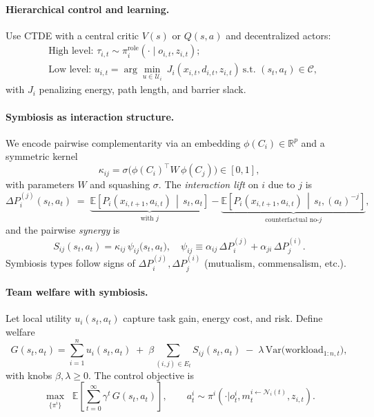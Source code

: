\paragraph{Hierarchical control and learning.}
Use CTDE with a central critic $V(s)$ or $Q(s,a)$ and decentralized actors:
\[
\begin{aligned}
&\text{High level: } \tau_{i,t}\sim \pi^{\text{role}}_i(\cdot\mid o_{i,t},z_{i,t}); \\
&\text{Low level: } u_{i,t}=\arg\min_{u\in\mathcal{U}_i}\ J_i(x_{i,t},d_{i,t},z_{i,t})
\ \text{s.t. }(s_t,a_t)\in\mathcal{C},
\end{aligned}
\]
with $J_i$ penalizing energy, path length, and barrier slack.

\paragraph{Symbiosis as interaction structure.}
We encode pairwise complementarity via an embedding $\phi(C_i)\in\mathbb{R}^p$ and a symmetric kernel
\[
\kappa_{ij}=\sigma\!\big(\phi(C_i)^\top W\,\phi(C_j)\big)\in[0,1],
\]
with parameters $W$ and squashing $\sigma$. The \emph{interaction lift} on $i$ due to $j$ is
\[
\Delta P_i^{(j)}(s_t,a_t)\;=\; \underbrace{\mathbb{E}\!\left[P_i(x_{i,t+1},a_{i,t})\,\middle|\,s_t,a_t\right]}_{\text{with }j}
-\underbrace{\mathbb{E}\!\left[P_i(x_{i,t+1},a_{i,t})\,\middle|\,s_t,(a_t)^{-j}\right]}_{\text{counterfactual no-$j$}},
\]
and the pairwise \emph{synergy} is
\[
S_{ij}(s_t,a_t)=\kappa_{ij}\,\psi_{ij}\!\big(s_t,a_t\big),
\quad \psi_{ij}\equiv \alpha_{ij}\,\Delta P_i^{(j)}+\alpha_{ji}\,\Delta P_j^{(i)}.
\]
Symbiosis types follow signs of $\Delta P_i^{(j)},\Delta P_j^{(i)}$ (mutualism, commensalism, etc.).

\paragraph{Team welfare with symbiosis.}
Let local utility $u_i(s_t,a_t)$ capture task gain, energy cost, and risk. Define welfare
\[
G(s_t,a_t)=\sum_{i=1}^n u_i(s_t,a_t)
\;+\;\beta \sum_{(i,j)\in E_t} S_{ij}(s_t,a_t)
\;-\;\lambda\,\mathrm{Var}\!\big(\text{workload}_{1:n,t}\big),
\]
with knobs $\beta,\lambda\ge 0$. The control objective is
\[
\max_{\{\pi^i\}}\;\; \mathbb{E}\!\left[\sum_{t=0}^{\infty}\gamma^t\,G(s_t,a_t)\right],
\qquad a_t^i\sim \pi^i(\cdot|o_t^i,m_{t}^{i\leftarrow\mathcal{N}_i(t)},z_{i,t}).
\]

